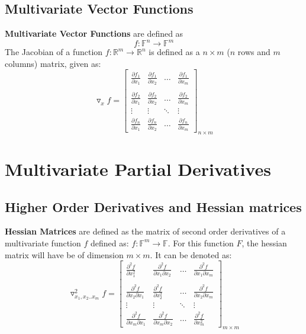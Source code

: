 \documentclass[12pt, a4paper]{book}
\begin{document}
\subsection{Multivariate Vector Functions}
\textbf{Multivariate Vector Functions} are defined as $$f: \mathbb{F}^n \to \mathbb{F}^m$$
The Jacobian of a function $f: \mathbb{R}^m \to \mathbb{R}^n$ is defined as a $n \times m$ ($n$ rows and $m$ columns) matrix, given as:
$$\triangledown_xf = \begin{bmatrix}
    \frac{\partial f_1}{\partial x_1} & \frac{\partial f_1}{\partial x_2} & \ldots & 
    \frac{\partial f_1}{\partial x_m}\\\\
    \frac{\partial f_2}{\partial x_1} & \frac{\partial f_2}{\partial x_2} & \ldots & \frac{\partial f_2}{\partial x_m}\\
    \vdots & \vdots & \ddots & \vdots\\
    \frac{\partial f_n}{\partial x_1} & \frac{\partial f_n}{\partial x_2} & \ldots & \frac{\partial f_n}{\partial x_m}
\end{bmatrix}_{n \times m}$$


\section{Multivariate Partial Derivatives}

\subsection{Higher Order Derivatives and Hessian matrices}
\textbf{Hessian Matrices} are defined as the matrix of second order derivatives of a multivariate function $f$ defined as: $f: \mathbb{F}^m \to \mathbb{F}$. For this function $F$, the hessian matrix will have be of dimension $m \times m$. It can be denoted as:
$$\triangledown^2_{x_1,x_2..x_m}f = \begin{bmatrix}
    \frac{\partial^2 f}{\partial x_1^2} & \frac{\partial^2 f}{\partial x_1\partial x_2} & \ldots & \frac{\partial^2 f}{\partial x_1\partial x_m}\\\\
    \frac{\partial^2 f}{\partial x_2\partial x_1} & \frac{\partial^2 f}{\partial x_2^2} & \ldots & \frac{\partial^2 f}{\partial x_2\partial x_m}\\
    \vdots & \vdots & \ddots & \vdots\\
    \frac{\partial^2 f}{\partial x_m\partial x_1} & \frac{\partial^2 f}{\partial x_m\partial x_2} & \ldots & \frac{\partial^2 f}{\partial x_m^2}
\end{bmatrix}_{m \times m}$$
\end{document}
